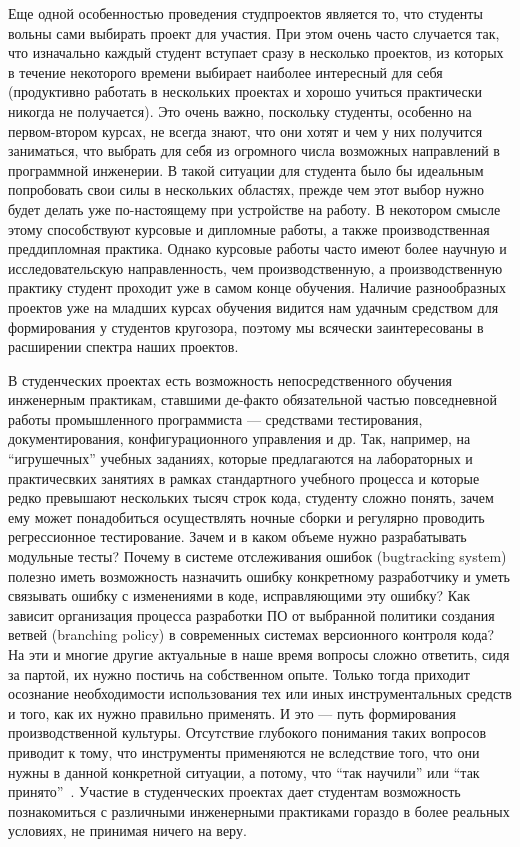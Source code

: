 \documentclass[a4paper]{article}
\begin{document}
Еще одной особенностью проведения студпроектов является то, что студенты вольны сами выбирать проект для участия. При этом очень часто случается так, что изначально каждый студент вступает сразу в несколько проектов, из которых в течение некоторого времени выбирает наиболее интересный для себя (продуктивно работать в нескольких проектах и хорошо учиться практически никогда не получается). Это очень важно, поскольку студенты, особенно на первом-втором курсах, не всегда знают, что они хотят и чем у них получится заниматься, что выбрать для себя из огромного числа возможных направлений в программной инженерии. В такой ситуации для студента было бы идеальным попробовать свои силы в нескольких областях, прежде чем этот выбор нужно будет делать уже по-настоящему при устройстве на работу. В некотором смысле этому способствуют курсовые и дипломные работы, а также производственная преддипломная практика. Однако курсовые работы часто имеют более научную и  исследовательскую направленность, чем производственную, а производственную практику студент проходит уже в самом конце обучения. Наличие разнообразных проектов уже на младших курсах обучения видится нам удачным средством для формирования у студентов кругозора, поэтому мы всячески заинтересованы в расширении спектра наших проектов. 

В студенческих проектах есть возможность непосредственного обучения инженерным практикам, ставшими де-факто обязательной частью повседневной работы промышленного программиста --- средствами тестирования, документирования, конфигурационного управления и др. Так, например, на ``игрушечных'' учебных заданиях, которые предлагаются на лабораторных и практичесвких занятиях в рамках стандартного учебного процесса и которые редко превышают нескольких тысяч строк кода, студенту сложно понять, зачем ему может понадобиться осуществлять ночные сборки и регулярно проводить регрессионное тестирование. Зачем и в каком объеме нужно разрабатывать модульные тесты? Почему в системе отслеживания ошибок (bugtracking system) полезно иметь возможность назначить ошибку конкретному разработчику и уметь связывать ошибку с изменениями в коде, исправляющими эту ошибку? Как зависит организация процесса разработки ПО от выбранной политики создания ветвей (branching policy) в современных системах версионного контроля кода? На эти и многие другие актуальные в наше время вопросы сложно ответить, сидя за партой, их нужно постичь на собственном опыте. Только тогда приходит осознание необходимости использования тех или иных инструментальных средств и того, как их нужно правильно применять. И это --- путь формирования производственной культуры. Отсутствие глубокого понимания таких вопросов приводит к тому, что инструменты применяются не вследствие того, что они нужны в данной конкретной ситуации, а потому, что ``так научили'' или ``так принято''~\cite{cargoCult}. Участие в студенческих проектах дает студентам возможность познакомиться с различными инженерными практиками гораздо в более реальных условиях, не принимая ничего на веру. 
\end{document}
